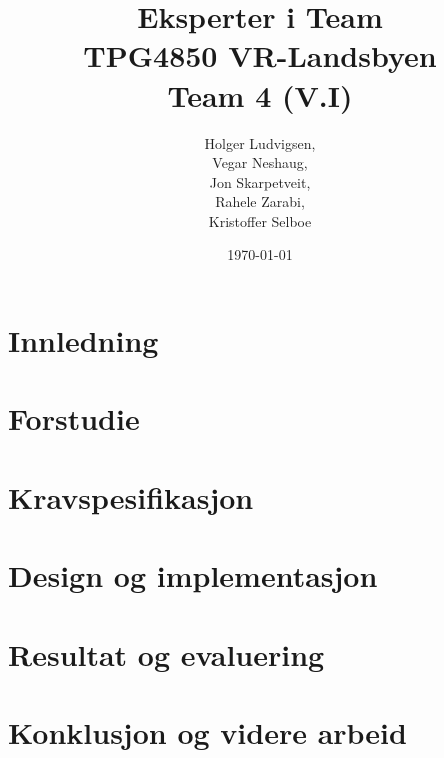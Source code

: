 \documentclass[12pt]{report}
\author{Holger Ludvigsen,\\Vegar Neshaug,\\Jon Skarpetveit,\\Rahele Zarabi,\\Kristoffer Selboe}
\title{{\small Eksperter i Team\\TPG4850 VR-Landsbyen}\\\textbf{Team 4 (V.I)}}
\date{{\small \today}}
\begin{document}
\maketitle



\pagebreak
	
\setlength{\parskip}{0.0in}
\renewcommand*\contentsname{Innhold}
\tableofcontents
\renewcommand*\listtablename{Tabell-liste}
\listoftables
\renewcommand*\listfigurename{Figurliste}
\listoffigures

\pagebreak
\setlength{\parskip}{0.1in}

\renewcommand*\chaptername{Kapittel}
\renewcommand*\partname{Del}

\setcounter{page}{1} %

\chapter{Innledning}

	

\chapter{Forstudie}

	

\chapter{Kravspesifikasjon}

	
	
\chapter{Design og implementasjon}

	

\chapter{Resultat og evaluering}

	

\chapter{Konklusjon og videre arbeid}

	
\end{document}

